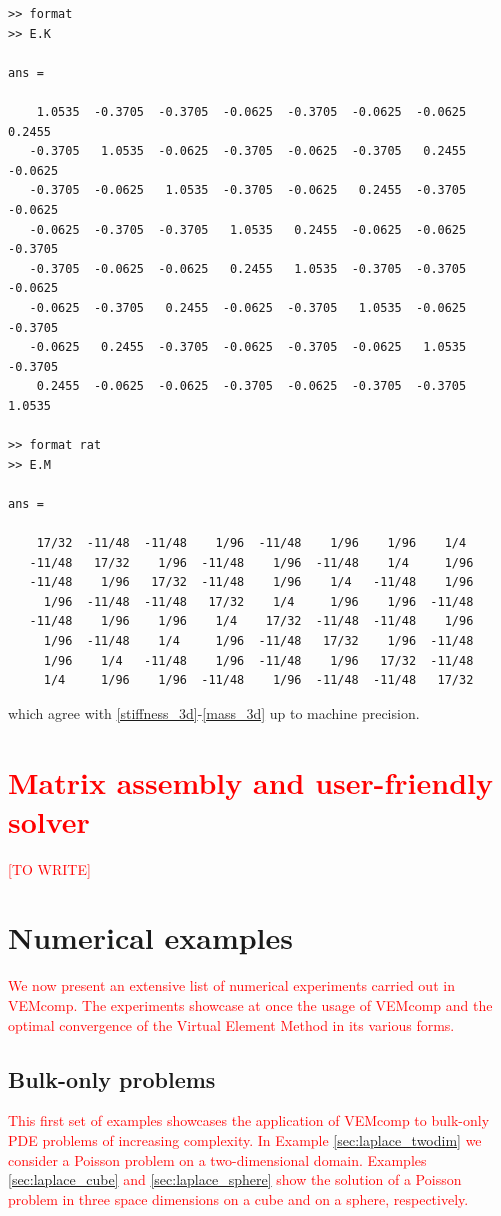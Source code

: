 \documentclass[a4paper]{article}
\newcommand{\red}[1]{\textcolor{red}{#1}}
\begin{document}
\begin{lstlisting}
>> format
>> E.K

ans =

    1.0535  -0.3705  -0.3705  -0.0625  -0.3705  -0.0625  -0.0625   0.2455
   -0.3705   1.0535  -0.0625  -0.3705  -0.0625  -0.3705   0.2455  -0.0625
   -0.3705  -0.0625   1.0535  -0.3705  -0.0625   0.2455  -0.3705  -0.0625
   -0.0625  -0.3705  -0.3705   1.0535   0.2455  -0.0625  -0.0625  -0.3705
   -0.3705  -0.0625  -0.0625   0.2455   1.0535  -0.3705  -0.3705  -0.0625
   -0.0625  -0.3705   0.2455  -0.0625  -0.3705   1.0535  -0.0625  -0.3705
   -0.0625   0.2455  -0.3705  -0.0625  -0.3705  -0.0625   1.0535  -0.3705
    0.2455  -0.0625  -0.0625  -0.3705  -0.0625  -0.3705  -0.3705   1.0535
      
>> format rat
>> E.M

ans =

    17/32  -11/48  -11/48    1/96  -11/48    1/96    1/96    1/4
   -11/48   17/32    1/96  -11/48    1/96  -11/48    1/4     1/96
   -11/48    1/96   17/32  -11/48    1/96    1/4   -11/48    1/96    
     1/96  -11/48  -11/48   17/32    1/4     1/96    1/96  -11/48    
   -11/48    1/96    1/96    1/4    17/32  -11/48  -11/48    1/96    
     1/96  -11/48    1/4     1/96  -11/48   17/32    1/96  -11/48    
     1/96    1/4   -11/48    1/96  -11/48    1/96   17/32  -11/48    
     1/4     1/96    1/96  -11/48    1/96  -11/48  -11/48   17/32  
\end{lstlisting}

\noindent
which agree with \eqref{stiffness_3d}-\eqref{mass_3d} up to machine precision.

\section{\red{Matrix assembly and user-friendly solver}}
\label{sec:user_friendly_solver}
\red{[TO WRITE]}


\section{Numerical examples}
\label{sec:numerical_examples}
\red{We now present an extensive list of numerical experiments carried out in VEMcomp. The experiments showcase at once the usage of VEMcomp and the optimal convergence of the Virtual Element Method in its various forms.}


\subsection{Bulk-only problems}
\red{This first set of examples showcases the application of VEMcomp to bulk-only PDE problems of increasing complexity. In Example \ref{sec:laplace_twodim} we consider a Poisson problem on a two-dimensional domain. Examples \ref{sec:laplace_cube} and \ref{sec:laplace_sphere} show the solution of a Poisson problem in three space dimensions on a cube and on a sphere, respectively.}
\end{document}
